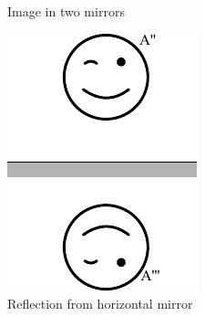 {\begin{figure}[h]
	\caption{Image in two mirrors}
\end{figure}
\begin{figure}[h]
	\centerline{\includegraphics[scale=1.1]{2016-v3g-08-nurgapeegel_j3}}
	\caption{Reflection from horizontal mirror}
\end{figure}
\fi
}